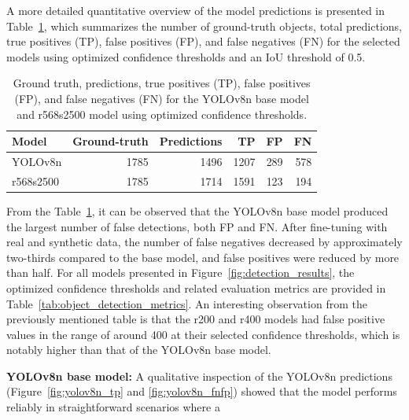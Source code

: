 A more detailed quantitative overview of the model predictions is presented in Table~\ref{tab:selected_models_counts}, which summarizes the number of ground-truth objects, total predictions, true positives (TP), false positives (FP), and false negatives (FN) for the selected models using optimized confidence thresholds and an IoU threshold of 0.5.

\begin{table}[htbp]
    \caption{Ground truth, predictions, true positives (TP), false positives (FP), and false negatives (FN) for the YOLOv8n base model and r568s2500 model using optimized confidence thresholds.}
\label{tab:selected_models_counts}
\centering
\renewcommand{\arraystretch}{1.15}
\setlength{\tabcolsep}{8pt}
\begin{tabular}{|l|r|r|r|r|r|}
\hline
Model & Ground-truth & Predictions & TP & FP & FN \\ \hline
YOLOv8n    & 1785 & 1496 & 1207 & 289 & 578 \\ \hline
r568s2500  & 1785 & 1714 & 1591 & 123 & 194 \\ \hline
\end{tabular}
\end{table}

From the Table~\ref{tab:selected_models_counts}, it can be observed that the YOLOv8n base model produced the largest number of false detections, both FP and FN. After fine-tuning with real and synthetic data, the number of false negatives decreased by approximately two-thirds compared to the base model, and false positives were reduced by more than half. For all models presented in Figure~\ref{fig:detection_results}, the optimized confidence thresholds and related evaluation metrics are provided in Table~\ref{tab:object_detection_metrics}. An interesting observation from  the previously mentioned table is that the r200 and r400 models had false positive values in the range of around 400 at their selected confidence thresholds, which is notably higher than that of the YOLOv8n base model.

\vspace{5pt}
\noindent
\textbf{YOLOv8n base model:}  
A qualitative inspection of the YOLOv8n predictions (Figure~\ref{fig:yolov8n_tp} and \ref{fig:yolov8n_fnfp}) showed that the model performs reliably in straightforward scenarios where a 

